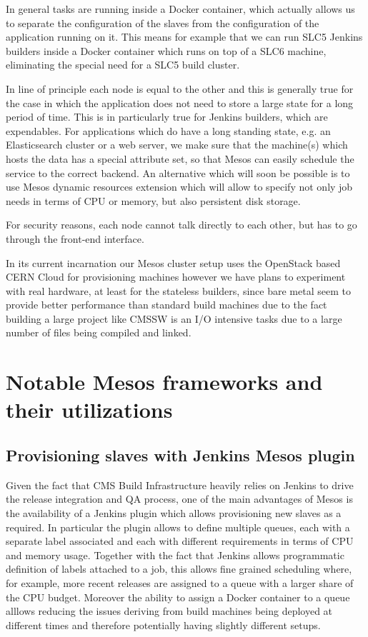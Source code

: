 \documentclass[a4paper]{jpconf}
\begin{document}
In general tasks are running inside a Docker container, which actually allows us
to separate the configuration of the slaves from the configuration of the
application running on it. This means for example that we can run SLC5 Jenkins
builders inside a Docker container which runs on top of a SLC6 machine,
eliminating the special need for a SLC5 build cluster.

In line of principle each node is equal to the other and this is generally true
for the case in which the application does not need to store a large state for a
long period of time. This is in particularly true for Jenkins builders, which
are expendables. For applications which do have a long standing state, e.g. an
Elasticsearch cluster or a web server, we make sure that the machine(s) which
hosts the data has a special attribute set, so that Mesos can easily schedule
the service to the correct backend. An alternative which will soon be possible
is to use Mesos dynamic resources extension which will allow to specify not only
job needs in terms of CPU or memory, but also persistent disk storage.

For security reasons, each node cannot talk directly to each other, but has to
go through the front-end interface.

In its current incarnation our Mesos cluster setup uses the OpenStack based CERN
Cloud for provisioning machines however we have plans to experiment with real
hardware, at least for the stateless builders, since bare metal seem to provide
better performance than standard build machines due to the fact building a large
project like CMSSW is an I/O intensive tasks due to a large number of files
being compiled and linked.

\section{Notable Mesos frameworks and their utilizations}

\subsection{Provisioning slaves with Jenkins Mesos plugin}

Given the fact that CMS Build Infrastructure heavily relies on Jenkins to drive
the release integration and QA process, one of the main advantages of Mesos is
the availability of a Jenkins plugin which allows provisioning new slaves as a
required. In particular the plugin allows to define multiple queues, each with a
separate label associated and each with different requirements in terms of CPU
and memory usage. Together with the fact that Jenkins allows programmatic
definition of labels attached to a job, this allows fine grained scheduling
where, for example, more recent releases are assigned to a queue with a larger
share of the CPU budget. Moreover the ability to assign a Docker container to a
queue alllows reducing the issues deriving from build machines being deployed at
different times and therefore potentially having slightly different setups.
\end{document}
